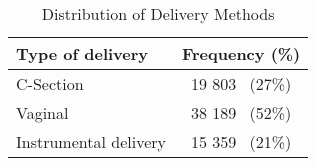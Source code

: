 \begin{table}[htbp]
  \centering
  \caption{Distribution of Delivery Methods}
  \label{tab:delivery_methods}
  \renewcommand{\arraystretch}{1.5} %
  \setlength{\tabcolsep}{12pt} %
  \begin{tabular}{lc}
    \hline
    \textbf{Type of delivery} & \textbf{Frequency (\%)} \\
\hline
    C-Section & 19 803 \, (27\%) \\

    Vaginal & 38 189 \, (52\%) \\

    Instrumental delivery & 15 359 \, (21\%) \\
    \hline
  \end{tabular}
\end{table}
